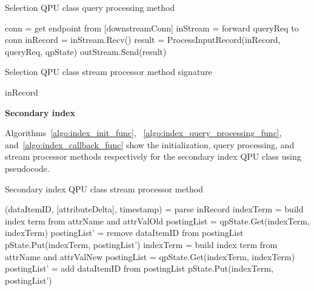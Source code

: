\begin{algorithm}
\caption{Selection QPU class query processing method}
\label{algo:filter_query_processing_func}
\begin{algorithmic}
\State conn = get endpoint from [downstreamConn] 
\State inStream = forward queryReq to conn
\State inRecord = inStream.Recv()
\State result = ProcessInputRecord(inRecord, queryReq, qpState)
\State outStream.Send(result)
\EndIf
\EndWhile
\EndFunction
\end{algorithmic}
\end{algorithm}

\begin{algorithm}
\caption{Selection QPU class stream processor method signature}
\label{algo:filter_algorithm_func}
\begin{algorithmic}
\State \Return inRecord
\Else
\State \Return []
\EndIf
\EndFunction
\end{algorithmic}
\end{algorithm}


\bigskip
\noindent
\textbf{Secondary index}

Algorithms~\ref{algo:index_init_func}, ~\ref{algo:index_query_processing_func}, and~\ref{algo:index_callback_func}
show the initialization, query processing, and stream processor methods respectively for the secondary index QPU
class using pseudocode.

\begin{algorithm}
\caption{Secondary index QPU class stream processor method}
\label{algo:index_callback_func}
\begin{algorithmic}
\State (dataItemID, [attributeDelta], timestamp) = parse inRecord
\State indexTerm = build index term from attrName and attrValOld
\State postingList = qpState.Get(indexTerm, indexTerm)
\State postingList' = remove dataItemID from postingList
\State pState.Put(indexTerm, postingList')
\EndIf
{}
\State indexTerm = build index term from attrName and attrValNew
\State postingList = qpState.Get(indexTerm, indexTerm)
\State postingList' = add dataItemID from postingList
\State pState.Put(indexTerm, postingList')
\EndIf
\EndFor
\EndFunction
\end{algorithmic}
\end{algorithm}

